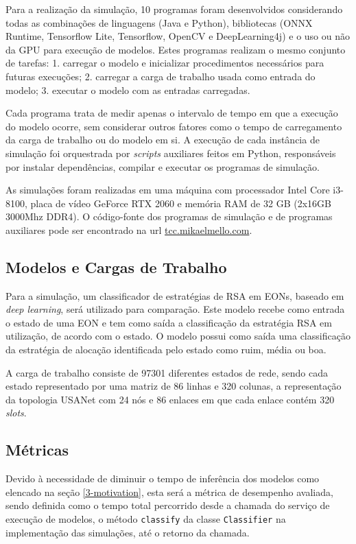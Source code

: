 Para a realização da simulação, 10 programas foram desenvolvidos considerando todas as combinações de linguagens (Java e Python), bibliotecas (ONNX Runtime, Tensorflow Lite, Tensorflow, OpenCV e DeepLearning4j) e o uso ou não da GPU para execução de modelos. Estes programas realizam o mesmo conjunto de tarefas: 1. carregar o modelo e inicializar procedimentos necessários para futuras execuções; 2. carregar a carga de trabalho usada como entrada do modelo; 3. executar o modelo com as entradas carregadas.

Cada programa trata de medir apenas o intervalo de tempo em que a execução do modelo ocorre, sem considerar outros fatores como o tempo de carregamento da carga de trabalho ou do modelo em si. A execução de cada instância de simulação foi orquestrada por \textit{scripts} auxiliares feitos em Python, responsáveis por instalar dependências, compilar e executar os programas de simulação.

As simulações foram realizadas em uma máquina com processador Intel Core i3-8100, placa de vídeo GeForce RTX 2060 e memória RAM de 32 GB (2x16GB 3000Mhz DDR4). O código-fonte dos programas de simulação e de programas auxiliares pode ser encontrado na url \url{tcc.mikaelmello.com}.

\subsection{Modelos e Cargas de Trabalho}

Para a simulação, um classificador de estratégias de RSA em EONs, baseado em \textit{deep learning}, será utilizado para comparação. Este modelo recebe como entrada o estado de uma EON e tem como saída a classificação da estratégia RSA em utilização, de acordo com o estado. O modelo possui como saída uma classificação da estratégia de alocação identificada pelo estado como ruim, média ou boa.

A carga de trabalho consiste de 97301 diferentes estados de rede, sendo cada estado representado por uma matriz de 86 linhas e 320 colunas, a representação da topologia USANet com 24 nós e 86 enlaces em que cada enlace contém 320 \textit{slots}.

\subsection{Métricas}

Devido à necessidade de diminuir o tempo de inferência dos modelos como elencado na seção \ref{3-motivation}, esta será a métrica de desempenho avaliada, sendo definida como o tempo total percorrido desde a chamada do serviço de execução de modelos, o método \texttt{classify} da classe \texttt{Classifier} na implementação das simulações, até o retorno da chamada.


